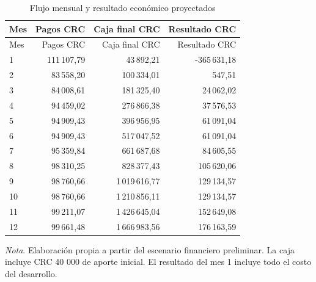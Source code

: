 \begin{longtable}{lrrr}
\caption{Flujo mensual y resultado económico proyectados}\\
\toprule
Mes & Pagos CRC & Caja final CRC & Resultado CRC \\
\midrule
\endfirsthead
\toprule
Mes & Pagos CRC & Caja final CRC & Resultado CRC \\
\midrule
\endhead
1 & 111\,107,79 & 43\,892,21 & -365\,631,18 \\
2 & 83\,558,20 & 100\,334,01 & 547,51 \\
3 & 84\,008,61 & 181\,325,40 & 24\,062,02 \\
4 & 94\,459,02 & 276\,866,38 & 37\,576,53 \\
5 & 94\,909,43 & 396\,956,95 & 61\,091,04 \\
6 & 94\,909,43 & 517\,047,52 & 61\,091,04 \\
7 & 95\,359,84 & 661\,687,68 & 84\,605,55 \\
8 & 98\,310,25 & 828\,377,43 & 105\,620,06 \\
9 & 98\,760,66 & 1\,019\,616,77 & 129\,134,57 \\
10 & 98\,760,66 & 1\,210\,856,11 & 129\,134,57 \\
11 & 99\,211,07 & 1\,426\,645,04 & 152\,649,08 \\
12 & 99\,661,48 & 1\,666\,983,56 & 176\,163,59 \\
\bottomrule
\end{longtable}
{\small\textit{Nota}. Elaboración propia a partir del escenario financiero preliminar. La caja incluye CRC 40 000 de aporte inicial. El resultado del mes 1 incluye todo el costo del desarrollo.}
